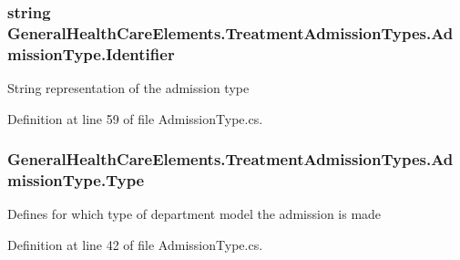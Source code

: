 \subsubsection[{\texorpdfstring{Identifier}{Identifier}}]{\setlength{\rightskip}{0pt plus 5cm}string General\+Health\+Care\+Elements.\+Treatment\+Admission\+Types.\+Admission\+Type.\+Identifier\hspace{0.3cm}{\ttfamily [get]}}\hypertarget{class_general_health_care_elements_1_1_treatment_admission_types_1_1_admission_type_affd4218fcdd5162ea5e0fb3e653d172a}{}\label{class_general_health_care_elements_1_1_treatment_admission_types_1_1_admission_type_affd4218fcdd5162ea5e0fb3e653d172a}


String representation of the admission type 



Definition at line 59 of file Admission\+Type.\+cs.

\subsubsection[{\texorpdfstring{Type}{Type}}]{ General\+Health\+Care\+Elements.\+Treatment\+Admission\+Types.\+Admission\+Type.\+Type\hspace{0.3cm}{\ttfamily [get]}}\hypertarget{class_general_health_care_elements_1_1_treatment_admission_types_1_1_admission_type_a658049b2a277d4cde9c50d2d94ebd4dc}{}\label{class_general_health_care_elements_1_1_treatment_admission_types_1_1_admission_type_a658049b2a277d4cde9c50d2d94ebd4dc}


Defines for which type of department model the admission is made 



Definition at line 42 of file Admission\+Type.\+cs.


